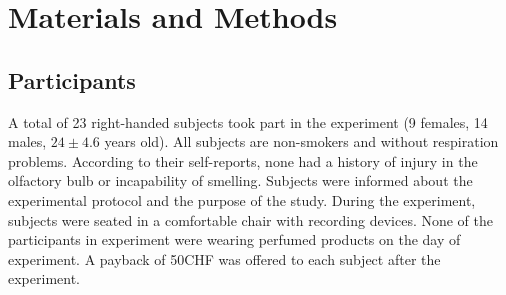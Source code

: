 \documentclass[conference]{IEEEtran}
\begin{document}
%



\section{Materials and Methods}

\subsection{Participants}
A total of 23 right-handed subjects took part in the experiment (9 females, 14 males, $24 \pm 4.6$ years old). All subjects are non-smokers and without respiration problems. According to their self-reports, none had a history of injury in the olfactory bulb or incapability of smelling. Subjects were informed about the experimental protocol and the purpose of the study. During the experiment, subjects were seated in a comfortable chair with recording devices. None of the participants in experiment were wearing perfumed products on the day of experiment. A payback of 50CHF was offered to each subject after the experiment. 
\end{document}
